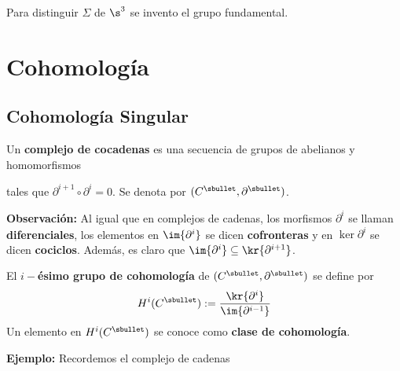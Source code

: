 \documentclass{article}
\begin{document}
\vspace{2mm}
\noindent Para distinguir $\Sigma$ de $\s^{3}$ se invento el grupo fundamental.

\newpage
\section{Cohomología}

\subsection{Cohomología Singular}
\begin{dfn}
    Un \textbf{complejo de cocadenas} es una secuencia de grupos de abelianos y homomorfismos
    
    \vspace{2mm}
    \centerline{
    }

    \vspace{2mm}
    \noindent tales que $\partial^{i+1}\circ\partial^{i}=0$. Se denota por 
    $(C^{\sbullet},\partial^{\sbullet})$.
\end{dfn}

\noindent\textbf{Observación:} Al igual que en complejos de cadenas, los morfismos $\partial^{i}$
se llaman \textbf{diferenciales}, los elementos en $\im{\partial^{i}}$ se dicen 
\textbf{cofronteras} y en $\ker{\partial^{i}}$ se dicen \textbf{cociclos}. Además, es claro que 
$\im{\partial^{i}}\subseteq\kr{\partial^{i+1}}$.

\vspace{2mm}
\begin{dfn}
    El \textbf{$i-$ésimo grupo de cohomología} de $(C^{\sbullet},\partial^{\sbullet})$ se define
    por 
    \begin{equation*}
        H^{i}(C^{\sbullet}):=\frac{\kr{\partial^{i}}}{\im{\partial^{i-1}}}
    \end{equation*}
    Un elemento en $H^{i}(C^{\sbullet})$ se conoce como \textbf{clase de cohomología}.
\end{dfn}

\vspace{2mm}
\noindent\textbf{Ejemplo:} Recordemos el complejo de cadenas

\vspace{2mm}
    \centerline{
    }
\end{document}
